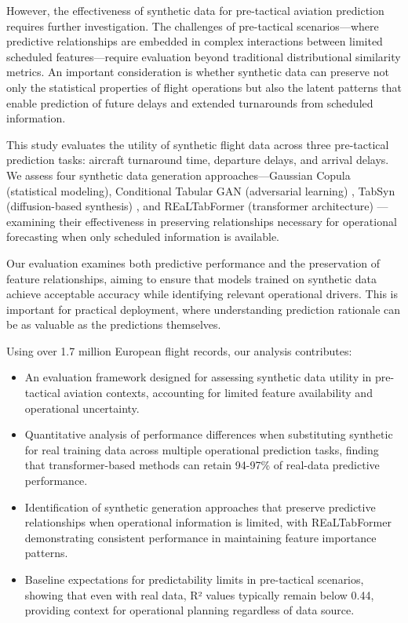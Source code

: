 \documentclass[conference]{IEEEtran}
\begin{document}
However, the effectiveness of synthetic data for pre-tactical aviation prediction requires further investigation. The challenges of pre-tactical scenarios—where predictive relationships are embedded in complex interactions between limited scheduled features—require evaluation beyond traditional distributional similarity metrics. An important consideration is whether synthetic data can preserve not only the statistical properties of flight operations but also the latent patterns that enable prediction of future delays and extended turnarounds from scheduled information.


This study evaluates the utility of synthetic flight data across three pre-tactical prediction tasks: aircraft turnaround time, departure delays, and arrival delays. We assess four synthetic data generation approaches—Gaussian Copula (statistical modeling), Conditional Tabular GAN (adversarial learning) \cite{xu2019modeling}, TabSyn (diffusion-based synthesis) \cite{zhang2024mixed}, and REaLTabFormer (transformer architecture) \cite{solatorio2023realtabformer}—examining their effectiveness in preserving relationships necessary for operational forecasting when only scheduled information is available.



Our evaluation examines both predictive performance and the preservation of feature relationships, aiming to ensure that models trained on synthetic data achieve acceptable accuracy while identifying relevant operational drivers. This is important for practical deployment, where understanding prediction rationale can be as valuable as the predictions themselves.



Using over 1.7 million European flight records, our analysis contributes:
\begin{itemize}
\item An evaluation framework designed for assessing synthetic data utility in pre-tactical aviation contexts, accounting for limited feature availability and operational uncertainty.
\item Quantitative analysis of performance differences when substituting synthetic for real training data across multiple operational prediction tasks, finding that transformer-based methods can retain 94-97\% of real-data predictive performance.
\item Identification of synthetic generation approaches that preserve predictive relationships when operational information is limited, with REaLTabFormer demonstrating consistent performance in maintaining feature importance patterns.
\item Baseline expectations for predictability limits in pre-tactical scenarios, showing that even with real data, R² values typically remain below 0.44, providing context for operational planning regardless of data source.
\end{itemize}
\end{document}
